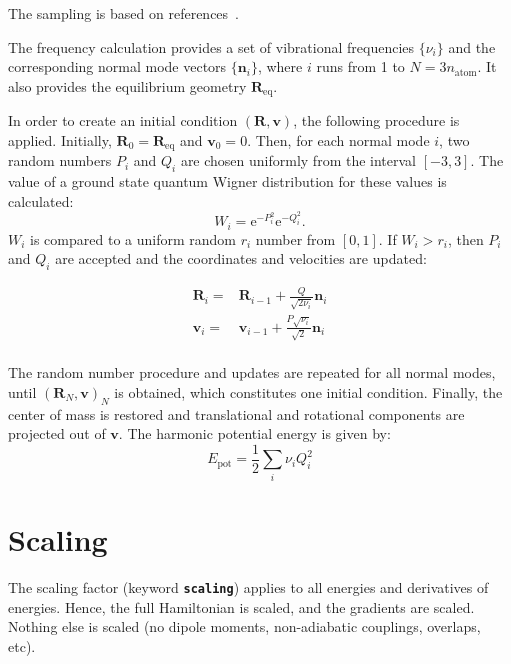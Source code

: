 \documentclass[a4paper,11pt,DIV=15,openany,twoside=false]{scrbook}
\newcommand{\tthdump}[1]{#1}
\newcommand{\ttt}[1]{\textbf{\texttt{#1}}}
\newcommand{\E}{\ensuremath{\mathrm{e}}}
\newcommand{\VEC}[1]{\ensuremath{\mathbf{#1}}}
\begin{document}
The sampling is based on references~\cite{Dahl1988JCP, Schinke1995}.

The frequency calculation provides a set of vibrational frequencies $\{\nu_i\}$ and the corresponding normal mode vectors $\{\VEC{n}_i\}$, where $i$ runs from 1 to $N=3n_{\text{atom}}$. It also provides the equilibrium geometry $\VEC{R}_{\text{eq}}$.

In order to create an initial condition $(\VEC{R},\VEC{v})$, the following procedure is applied. Initially, $\VEC{R}_0=\VEC{R}_{\text{eq}}$ and $\VEC{v}_0=0$. Then, for each normal mode $i$, two random numbers $P_i$ and $Q_i$ are chosen uniformly from the interval $[-3,3]$. The value of a ground state quantum Wigner distribution for these values is calculated:
\begin{equation}
  W_i=\E^{-P_i^2}\E^{-Q_i^2}.
\end{equation}
$W_i$ is compared to a uniform random $r_i$ number from $[0,1]$. If $W_i>r_i$, then $P_i$ and $Q_i$ are accepted and the coordinates and velocities are updated:
\tthdump{
  \begin{align}
    \VEC{R}_i=&\VEC{R}_{i-1} + \frac{Q}{\sqrt{2\nu_i}}\VEC{n}_i\\
    \VEC{v}_i=&\VEC{v}_{i-1} + \frac{P\sqrt{\nu_i}}{\sqrt{2}}\VEC{n}_i\\
  \end{align}
}
The random number procedure and updates are repeated for all normal modes, until $(\VEC{R}_N,\VEC{v})_N$ is obtained, which constitutes one initial condition. Finally, the center of mass is restored and translational and rotational components are projected out of $\VEC{v}$. The harmonic potential energy is given by:
\begin{equation}
  E_{\text{pot}}=\frac{1}{2}\sum\limits_i \nu_iQ_i^2
\end{equation}


\section{Scaling}\label{met:scaling}

The scaling factor (keyword \ttt{scaling}) applies to all energies and derivatives of energies. Hence, the full Hamiltonian is scaled, and the gradients are scaled. Nothing else is scaled (no dipole moments, non-adiabatic couplings, overlaps, etc).
\end{document}
